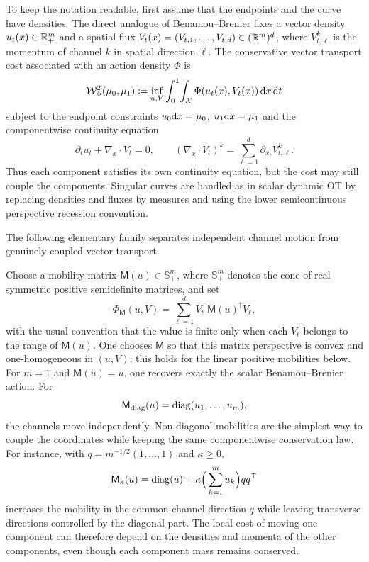 To keep the notation readable, first assume that the endpoints and the curve have densities. The direct analogue of Benamou--Brenier fixes a vector density $u_t(x)\in\mathbb{R}_+^m$ and a spatial flux
$V_t(x)=(V_{t,1},\ldots,V_{t,d})\in(\mathbb{R}^m)^d$, where $V_{t,\ell}^k$ is the momentum of channel $k$ in spatial direction $\ell$. The conservative vector transport cost associated with an action density $\Phi$ is
\begin{equation}\label{eq-vector-valued-bb}
	\mathcal W_{\Phi}^2(\mu_0,\mu_1)
	\coloneqq
	\inf_{u,V}
	\int_0^1\!\int_{\mathcal{X}}
	\Phi(u_t(x),V_t(x))\,\mathrm{d} x\,\mathrm{d} t
\end{equation}
subject to the endpoint constraints $u_0\mathrm{d} x=\mu_0$, $u_1\mathrm{d} x=\mu_1$ and the componentwise continuity equation
\begin{equation}\label{eq-vector-valued-continuity}
	\partial_t u_t+\nabla_x\cdot V_t=0,
	\qquad
	(\nabla_x\cdot V_t)^k=\sum_{\ell=1}^d \partial_{x_\ell} V_{t,\ell}^k .
\end{equation}
Thus each component satisfies its own continuity equation, but the cost may still couple the components. Singular curves are handled as in scalar dynamic OT by replacing densities and fluxes by measures and using the lower semicontinuous perspective recession convention.

The following elementary family separates independent channel motion from genuinely coupled vector transport.

\begin{example}
Choose a mobility matrix $\mathsf M(u)\in\mathbb S_+^m$, where $\mathbb S_+^m$ denotes the cone of real symmetric positive semidefinite matrices, and set
\[
	\Phi_{\mathsf M}(u,V)
	=
	\sum_{\ell=1}^d V_{\ell}^{\top}\mathsf M(u)^\dagger V_{\ell},
\]
with the usual convention that the value is finite only when each $V_\ell$ belongs to the range of $\mathsf M(u)$. One chooses $\mathsf M$ so that this matrix perspective is convex and one-homogeneous in $(u,V)$; this holds for the linear positive mobilities below. For $m=1$ and $\mathsf M(u)=u$, one recovers exactly the scalar Benamou--Brenier action. For
\[
	\mathsf M_{\mathrm{diag}}(u)=\operatorname{diag}(u_1,\ldots,u_m),
\]
the channels move independently. Non-diagonal mobilities are the simplest way to couple the coordinates while keeping the same componentwise conservation law. For instance, with $q=m^{-1/2}(1,\ldots,1)$ and $\kappa\geq0$,
\[
	\mathsf M_\kappa(u)=\operatorname{diag}(u)+\kappa\Big(\sum_{k=1}^m u_k\Big) q q^\top
\]
increases the mobility in the common channel direction $q$ while leaving transverse directions controlled by the diagonal part. The local cost of moving one component can therefore depend on the densities and momenta of the other components, even though each component mass remains conserved.
\end{example}

